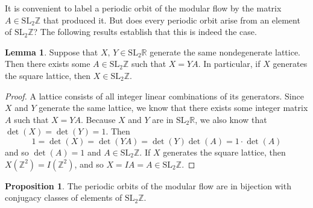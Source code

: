 \documentclass[12pt,twoside]{reedthesis}
\theoremstyle{definition}
\newtheorem{lemma}[thm]{Lemma}
\newtheorem{prop}[thm]{Proposition}
\newcommand{\Z}{\mathbb{Z}}
\newcommand{\R}{\mathbb{R}}
\newcommand{\SLZ}{\mathrm{SL}_2{\Z}}
\newcommand{\SLR}{\mathrm{SL}_2{\R}}
\begin{document}
It is convenient to label a periodic orbit of the modular flow by the matrix $A \in \SLZ$ that produced it.
But does every periodic orbit arise from an element of $\SLZ$?
The following results establish that this is indeed the case.

\begin{lemma}\label{lemma:m_is_integer}
  Suppose that $X,\, Y \in \SLR$ generate the same nondegenerate lattice.
  Then there exists some $A \in \SLZ$ such that $X = YA$.
  In particular, if $X$ generates the square lattice, then $X \in \SLZ$.
\end{lemma}

\begin{proof}
  A lattice consists of all integer linear combinations of its generators.
  Since $X$ and $Y$ generate the same lattice, we know that there exists some integer matrix $A$ such that $X = YA$.
  Because $X$ and $Y$ are in $\SLR$, we also know that $\det(X) = \det(Y) = 1$. Then
  \begin{equation*}
    1 = \det(X) = \det(YA) = \det(Y)\det(A) = 1 \cdot \det(A)
  \end{equation*}
  and so $\det(A) = 1$ and $A \in \SLZ$.
  If $X$ generates the square lattice, then $X(\Z^2) = I(\Z^2)$, and so $X = IA = A \in \SLZ$.
\end{proof}

\begin{prop}
  The periodic orbits of the modular flow are in bijection with conjugacy classes of elements of $\SLZ$.
\end{prop}
\end{document}
